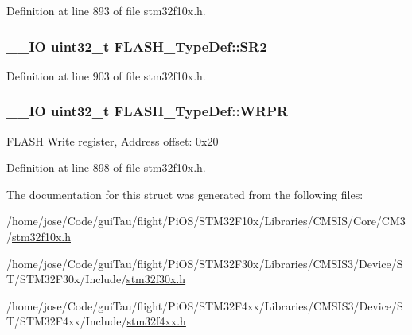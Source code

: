 Definition at line 893 of file stm32f10x.\-h.

\hypertarget{struct_f_l_a_s_h___type_def_ad697c10f0b4c43b943d09bc2b324592f}{
\subsubsection[{S\-R2}]{\setlength{\rightskip}{0pt plus 5cm}\-\_\-\-\_\-\-I\-O {\bf uint32\-\_\-t} F\-L\-A\-S\-H\-\_\-\-Type\-Def\-::\-S\-R2}}\label{struct_f_l_a_s_h___type_def_ad697c10f0b4c43b943d09bc2b324592f}


Definition at line 903 of file stm32f10x.\-h.

\hypertarget{struct_f_l_a_s_h___type_def_ac1889c0e17d868ab991f267ceb9dbb4b}{
\subsubsection[{W\-R\-P\-R}]{\setlength{\rightskip}{0pt plus 5cm}\-\_\-\-\_\-\-I\-O {\bf uint32\-\_\-t} F\-L\-A\-S\-H\-\_\-\-Type\-Def\-::\-W\-R\-P\-R}}\label{struct_f_l_a_s_h___type_def_ac1889c0e17d868ab991f267ceb9dbb4b}
F\-L\-A\-S\-H Write register, Address offset\-: 0x20 

Definition at line 898 of file stm32f10x.\-h.



The documentation for this struct was generated from the following files\-:\begin{DoxyCompactItemize}
\item 
/home/jose/\-Code/gui\-Tau/flight/\-Pi\-O\-S/\-S\-T\-M32\-F10x/\-Libraries/\-C\-M\-S\-I\-S/\-Core/\-C\-M3/\hyperlink{stm32f10x_8h}{stm32f10x.\-h}\item 
/home/jose/\-Code/gui\-Tau/flight/\-Pi\-O\-S/\-S\-T\-M32\-F30x/\-Libraries/\-C\-M\-S\-I\-S3/\-Device/\-S\-T/\-S\-T\-M32\-F30x/\-Include/\hyperlink{stm32f30x_8h}{stm32f30x.\-h}\item 
/home/jose/\-Code/gui\-Tau/flight/\-Pi\-O\-S/\-S\-T\-M32\-F4xx/\-Libraries/\-C\-M\-S\-I\-S3/\-Device/\-S\-T/\-S\-T\-M32\-F4xx/\-Include/\hyperlink{stm32f4xx_8h}{stm32f4xx.\-h}\end{DoxyCompactItemize}
